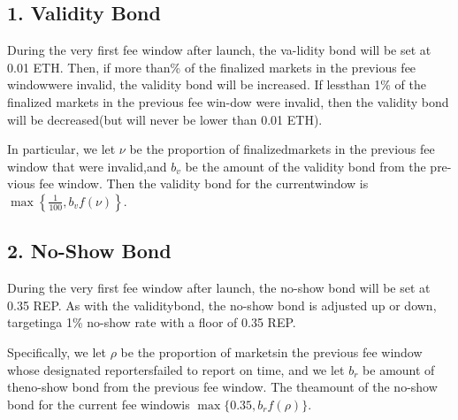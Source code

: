 \documentclass[12pt,floatfix,reprint,nofootinbib,amsmath,amssymb,epsfig,pre,floats,letterpaper,groupedaffiliation]{revtex4-1}
\theoremstyle{definition}
\theoremstyle{definition}
\begin{document}
\subsection*{1. Validity Bond}

During the very first fee window after launch, the va-\linebreak lidity bond will be set at 0.01 ETH. Then, if more than\% of the finalized markets in the previous fee window\linebreak were invalid, the validity bond will be increased. If less\linebreak than 1\% of the finalized markets in the previous fee win-\linebreak dow were invalid, then the validity bond will be decreased\linebreak (but will never be lower than 0.01 ETH).

In particular, we let $\nu$ be the proportion of finalized\linebreak markets in the previous fee window that were invalid,\linebreak and $b_v$ be the amount of the validity bond from the pre-\linebreak vious fee window. Then the validity bond for the current\linebreak window is $\max \left\{ \frac{1}{100}, b_vf(\nu) \right\}$.

\subsection*{2. No-Show Bond}

During the very first fee window after launch, the no-\linebreak show bond will be set at 0.35 REP. As with the validity\linebreak bond, the no-show bond is adjusted up or down, targeting\linebreak a 1\% no-show rate with a floor of 0.35 REP.

Specifically, we let $\rho$ be the proportion of markets\linebreak in the previous fee window whose designated reporters\linebreak failed to report on time, and we let $b_r$ be amount of the\linebreak no-show bond from the previous fee window. The the\linebreak amount of the no-show bond for the current fee window\linebreak is $\max \{0.35, b_rf(\rho)\}$.
\end{document}
